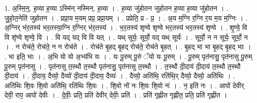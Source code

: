 \documentclass[17pt]{extarticle}
\begin{document}
1. अ॒स्मि॒न्॒. ह॒व्या ह॒व्या ऽस्मि॑न् नस्मिन्. ह॒व्या । . ह॒व्या जु॑होतन जुहोतन ह॒व्या ह॒व्या जु॑होतन । . जु॒हो॒त॒नेति॑ जुहोतन । . प्रप्रा॒य म॒यम् प्रप्र॒ प्रप्रा॒यम् । . प्रप्रेति॒ प्र - प्र॒ । . अ॒य म॒ग्नि र॒ग्नि र॒य म॒य म॒ग्निः । . अ॒ग्निर् भ॑र॒तस्य॑ भर॒तस्या॒ग्नि र॒ग्निर् भ॑र॒तस्य॑ । . भ॒र॒तस्य॑ शृण्वे शृण्वे भर॒तस्य॑ भर॒तस्य॑ शृण्वे । . शृ॒ण्वे॒ वि वि शृ॑ण्वे शृण्वे॒ वि । . वि यद् यद् वि वि यत् । . यथ् सूर्यः॒ सूर्यो॒ यद् यथ् सूर्यः॑ । . सूर्यो॒ न न सूर्यः॒ सूर्यो॒ न । . न रोच॑ते॒ रोच॑ते॒ न न रोच॑ते । . रोच॑ते बृ॒हद् बृ॒हद् रोच॑ते॒ रोच॑ते बृ॒हत् । . बृ॒हद् भा भा बृ॒हद् बृ॒हद् भाः । . भा इति॒ भाः । . अ॒भि यो यो अ॒भ्य॑भि यः । . यः पू॒रुम् पू॒रुं ॅयो यः पू॒रुम् । . पू॒रुम् पृत॑नासु॒ पृत॑नासु पू॒रुम् पू॒रुम् पृत॑नासु । . पृत॑नासु त॒स्थौ त॒स्थौ पृत॑नासु॒ पृत॑नासु त॒स्थौ । . त॒स्थौ दी॒दाय॑ दी॒दाय॑ त॒स्थौ त॒स्थौ दी॒दाय॑ । . दी॒दाय॒ दैव्यो॒ दैव्यो॑ दी॒दाय॑ दी॒दाय॒ दैव्यः॑ । . दैव्यो॒ अति॑थि॒ रति॑थि॒र् दैव्यो॒ दैव्यो॒ अति॑थिः । . अति॑थिः शि॒वः शि॒वो अति॑थि॒ रति॑थिः शि॒वः । . शि॒वो नो॑ नः शि॒वः शि॒वो नः॑ । . न॒ इति॑ नः । . आपो॑ देवीर् देवी॒ राप॒ आपो॑ देवीः । . दे॒वीः॒ प्रति॒ प्रति॑ देवीर् देवीः॒ प्रति॑ । . प्रति॑ गृह्णीत गृह्णीत॒ प्रति॒ प्रति॑ गृह्णीत । \newline
\end{document}
